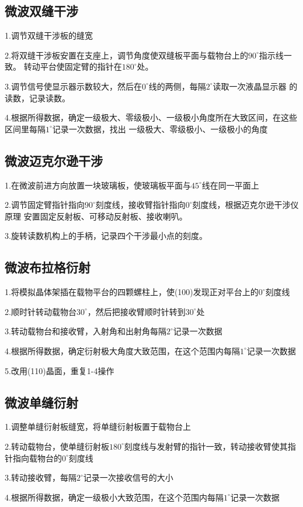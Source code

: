 \documentclass[12pt,a4paper]{article}
\begin{document}
    \subsection{微波双缝干涉}
    1.调节双缝干涉板的缝宽\par
    2.将双缝干涉板安置在支座上，调节角度使双缝板平面与载物台上的$90^{\circ}$指示线一致。
    转动平台使固定臂的指针在$180^{\circ}$处。\par
    3.调节信号使显示器示数较大，然后在$0^{\circ}$线的两侧，每隔$2^{\circ}$读取一次液晶显示器
    的读数，记录读数。\par
    4.根据所得数据，确定一级极大、零级极小、一级极小角度所在大致区间，在这些区间里每隔$1^{\circ}$记录一次数据，找出
    一级极大、零级极小、一级极小的角度\par

    \subsection{微波迈克尔逊干涉}
    1.在微波前进方向放置一块玻璃板，使玻璃板平面与$45^{\circ}$线在同一平面上\par
    2.调节固定臂指针指向$90^{\circ}$刻度线，接收臂指针指向$0^{\circ}$刻度线，根据迈克尔逊干涉仪原理
    安置固定反射板、可移动反射板、接收喇叭。\par
    3.旋转读数机构上的手柄，记录四个干涉最小点的刻度。
    \subsection{微波布拉格衍射}
    1.将模拟晶体架插在载物平台的四颗螺柱上，使(100)发现正对平台上的$0^{\circ}$刻度线\par
    2.顺时针转动载物台$30^{\circ}$，然后把接收臂顺时针转到$30^{\circ}$处\par
    3.转动载物台和接收臂，入射角和出射角每隔$2^{\circ}$记录一次数据\par
    4.根据所得数据，确定衍射极大角度大致范围，在这个范围内每隔$1^{\circ}$记录一次数据\par
    5.改用(110)晶面，重复1-4操作
    \subsection{微波单缝衍射}
    1.调整单缝衍射板缝宽，将单缝衍射板置于载物台上\par
    2.转动载物台，使单缝衍射板$180^{\circ}$刻度线与发射臂的指针一致，转动接收臂使其指针指向载物台的$0^{\circ}$刻度线\par
    3.转动接收臂，每隔$2^{\circ}$记录一次接收信号的大小\par
    4.根据所得数据，确定一级极小大致范围，在这个范围内每隔$1^{\circ}$记录一次数据\par
\end{document}
